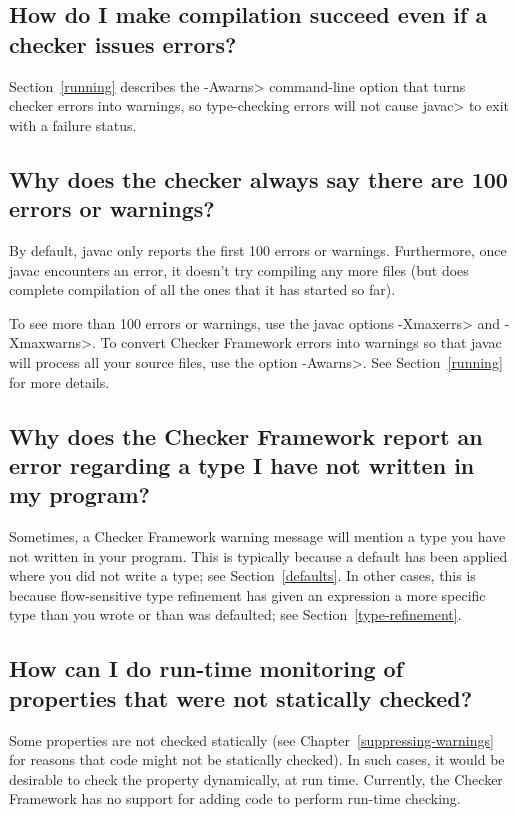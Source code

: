 \subsection{How do I make compilation succeed even if a checker issues errors?\label{faq-awarns}}

Section~\ref{running} describes the \<-Awarns> command-line
option that turns checker errors into warnings, so type-checking errors
will not cause \<javac> to exit with a failure status.


\subsection{Why does the checker always say there are 100 errors or warnings?\label{faq-100-warnings}}

By default, javac only reports the first 100 errors or warnings.
Furthermore, once javac encounters an error, it doesn't try compiling any
more files (but does complete compilation of all the ones that it has
started so far).

To see more than 100 errors or warnings, use the javac options \<-Xmaxerrs>
and \<-Xmaxwarns>.  To convert Checker Framework errors into warnings so
that javac will process all your source files, use the option \<-Awarns>.
See Section~\ref{running} for more details.


\subsection{Why does the Checker Framework report an error regarding a type I have not written in my program?\label{faq-type-i-did-not-write}}


Sometimes, a Checker Framework warning message will mention a type you have
not written in your program.  This is typically because a default has been
applied where you did not write a type; see Section~\ref{defaults}.  In
other cases, this is because flow-sensitive type refinement has given an
expression a more specific type than you wrote or than was defaulted; see
Section~\ref{type-refinement}.


\subsection{How can I do run-time monitoring of properties that were not statically checked?\label{faq-run-time-checking}}

Some properties are not checked statically (see
Chapter~\ref{suppressing-warnings} for reasons that code might not be
statically checked).  In such cases, it would be desirable to check the
property dynamically, at run time.
Currently, the Checker Framework has no support for adding code to perform
run-time checking.

